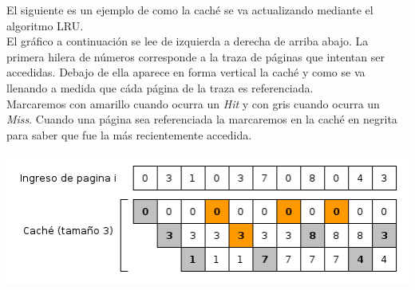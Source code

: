 \documentclass[11pt, a4paper, spanish]{article}
\begin{document}
El siguiente es un ejemplo de como la cach\'e se va actualizando mediante el algoritmo LRU.\\

El gr\'afico a continuaci\'on se lee de izquierda a derecha de arriba abajo. La primera hilera de n\'umeros corresponde a la traza de p\'aginas que intentan ser 
accedidas. Debajo de ella aparece en forma vertical la cach\'e y como se va llenando a medida que c\'ada p\'agina de la traza es referenciada.\\ 

Marcaremos con amarillo cuando ocurra un \textit{Hit} y con gris cuando ocurra un \textit{Miss}.
Cuando una p\'agina sea referenciada la marcaremos en la cach\'e en negrita para saber que fue la m\'as recientemente accedida.\\

\begin{center}
		\includegraphics[scale=0.65]{diagramas/LRUAlgorithm.png}\\
\end{center}
\end{document}
